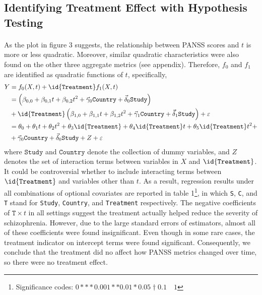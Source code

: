 \documentclass[11pt]{article}
\begin{document}
	\subsection{Identifying Treatment Effect with Hypothesis Testing}
	\paragraph{} As the plot in figure 3 suggests, the relationship between PANSS scores and $t$ is more or less quadratic. Moreover, similar quadratic characteristics were also found on the other three aggregate metrics (see appendix). Therefore, $f_0$ and $f_1$ are identified as quadratic functions of $t$, specifically,
	\begin{align}
		Y &= f_0(X, t) + \id{\texttt{Treatment}} f_1(X, t) \\
		&= \left(\beta_{0, 0} + \beta_{0, 1} t + \beta_{0, 2} t^2 + \vec{\gamma}_0 \texttt{Country} + \vec{\delta}_0 \texttt{Study}\right) \\
		&+ \id{\texttt{Treatment}} \left(\beta_{1, 0} + \beta_{1, 1} t + \beta_{1, 2} t^2 + \vec{\gamma}_1 \texttt{Country} + \vec{\delta}_1 \texttt{Study}\right) + \varepsilon \\
		&= \theta_0 + \theta_1 t + \theta_2 t^2 + \theta_3 \id{\texttt{Treatment}} + \theta_4 \id{\texttt{Treatment}} t + \theta_5 \id{\texttt{Treatment}} t^2 + \\
		&+\vec{\gamma}_0 \texttt{Country} + \vec{\delta}_0 \texttt{Study} + Z + \varepsilon
	\end{align}
	where $\texttt{Study}$ and $\texttt{Country}$ denote the collection of dummy variables, and $Z$ denotes the set of interaction terms between variables in $X$ and $\id{\texttt{Treatment}}$. It could be controversial whether to include interacting terms between $\id{\texttt{Treatment}}$ and variables other than $t$. As a result, regression results under all combinations of optional covariates are reported in table 1\footnote{Significance codes:  $0 *** 0.001 ** 0.01 * 0.05 \dagger 0.1 \quad 1$}, in which \texttt{S}, \texttt{C}, and \texttt{T} stand for \texttt{Study}, \texttt{Country}, and \texttt{Treatment} respectively. The negative coefficients of $\texttt{T} \times t$ in all settings suggest the treatment actually helped reduce the severity of schizophrenia. However, due to the large standard errors of estimators, almost all of these coefficients were found insignificant. Even though in some rare cases, the treatment indicator on intercept terms were found significant. Consequently, we conclude that the treatment did no affect how PANSS metrics changed over time, so there were no treatment effect.
\end{document}
